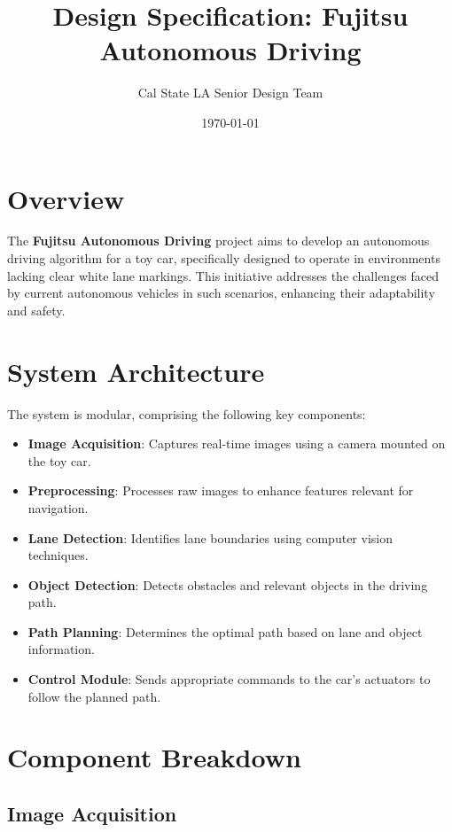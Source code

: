 \documentclass[12pt]{article}
\title{Design Specification: Fujitsu Autonomous Driving}
\author{Cal State LA Senior Design Team}
\date{\today}
\begin{document}
\maketitle

\tableofcontents

\newpage

\section{Overview}

The \textbf{Fujitsu Autonomous Driving} project aims to develop an autonomous driving algorithm for a toy car, specifically designed to operate in environments lacking clear white lane markings. This initiative addresses the challenges faced by current autonomous vehicles in such scenarios, enhancing their adaptability and safety.

\section{System Architecture}

The system is modular, comprising the following key components:

\begin{itemize}[leftmargin=*, label={--}]
  \item \textbf{Image Acquisition}: Captures real-time images using a camera mounted on the toy car.
  \item \textbf{Preprocessing}: Processes raw images to enhance features relevant for navigation.
  \item \textbf{Lane Detection}: Identifies lane boundaries using computer vision techniques.
  \item \textbf{Object Detection}: Detects obstacles and relevant objects in the driving path.
  \item \textbf{Path Planning}: Determines the optimal path based on lane and object information.
  \item \textbf{Control Module}: Sends appropriate commands to the car's actuators to follow the planned path.
\end{itemize}

\section{Component Breakdown}

\subsection{Image Acquisition}
\end{document}
